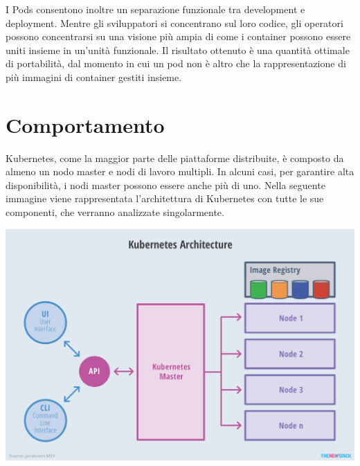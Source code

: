 \documentclass[12pt, a4paper]{report}
\begin{document}
I Pods consentono inoltre un separazione funzionale tra development e deployment. Mentre gli sviluppatori si concentrano sul loro codice, gli operatori possono concentrarsi su una visione più ampia di come i container possono essere uniti insieme in un'unità funzionale. Il risultato ottenuto è una quantità ottimale di portabilità, dal momento in cui un pod non è altro che la rappresentazione di più immagini di container gestiti insieme.
\chapter{Comportamento}
Kubernetes, come la maggior parte delle piattaforme distribuite, è composto da almeno un nodo master e nodi di lavoro multipli. In alcuni casi, per garantire alta disponibilità, i nodi master possono essere anche più di uno. Nella seguente immagine viene rappresentata l'architettura di Kubernetes con tutte le sue componenti, che verranno analizzate singolarmente.
\begin{center}
  \includegraphics[scale=0.5]{Images/Kubernetes-architecture}
\end{center}
\end{document}
